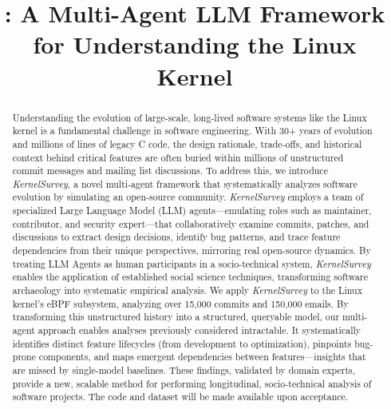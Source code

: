 \documentclass[sigconf,review,anonymous]{acmart}
\title{\sys: A Multi-Agent LLM Framework for Understanding the Linux Kernel}
\newcommand{\sys}{\textit{KernelSurvey}\xspace}
\begin{document}




\begin{abstract}
Understanding the evolution of large-scale, long-lived software systems like the Linux kernel is a fundamental challenge in software engineering. With 30+ years of evolution and millions of lines of legacy C code, the design rationale, trade-offs, and historical context behind critical features are often buried within millions of unstructured commit messages and mailing list discussions. To address this, we introduce \sys, a novel multi-agent framework that systematically analyzes software evolution by simulating an open-source community. \sys employs a team of specialized Large Language Model (LLM) agents—emulating roles such as maintainer, contributor, and security expert—that collaboratively examine commits, patches, and discussions to extract design decisions, identify bug patterns, and trace feature dependencies from their unique perspectives, mirroring real open-source dynamics. By treating LLM Agents as human participants in a socio-technical system, \sys enables the application of established social science techniques, transforming software archaeology into systematic empirical analysis. We apply \sys to the Linux kernel's eBPF subsystem, analyzing over 15,000 commits and 150,000 emails. By transforming this unstructured history into a structured, queryable model, our multi-agent approach enables analyses previously considered intractable. It systematically identifies distinct feature lifecycles (from development to optimization), pinpoints bug-prone components, and maps emergent dependencies between features—insights that are missed by single-model baselines. These findings, validated by domain experts, provide a new, scalable method for performing longitudinal, socio-technical analysis of software projects. The code and dataset will be made available upon acceptance.
\end{abstract}
\end{document}
